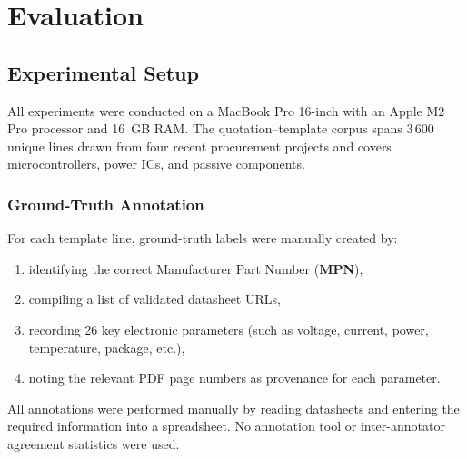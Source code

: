 \chapter{Evaluation}
\label{chapter:evaluation}

\section{Experimental Setup}
All experiments were conducted on a MacBook Pro 16-inch with an Apple M2 Pro processor and 16~GB RAM. The quotation–template corpus spans 3\,600 unique lines drawn from four recent procurement projects and covers microcontrollers, power ICs, and passive components.

\subsection{Ground-Truth Annotation}
For each template line, ground-truth labels were manually created by:
\begin{enumerate}
  \item identifying the correct Manufacturer Part Number (\textbf{MPN}),
  \item compiling a list of validated datasheet URLs,
  \item recording 26 key electronic parameters (such as voltage, current, power, temperature, package, etc.),
  \item noting the relevant PDF page numbers as provenance for each parameter.
\end{enumerate}
All annotations were performed manually by reading datasheets and entering the required information into a spreadsheet. No annotation tool or inter-annotator agreement statistics were used.

